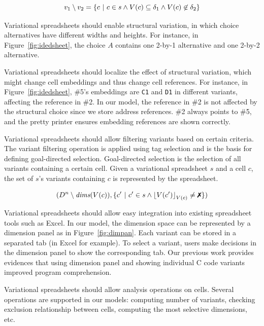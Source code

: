 \documentclass[conference]{IEEEtran}
\def\OB#1{\ifmmode#1\else\mbox{$#1$}\fi}
\newcommand{\prog}[1]{{\small\texttt{#1}}}
\newcommand{\dimset}[1][D]{\OB{#1^n}}
\newcommand{\dimsSym}{\textit{dims}}
\newcommand{\dims}[1]{\OB{\dimsSym(#1)}}
\newcommand{\dec}{\OB{\delta}}
\newcommand{\gcell}[1]{\##1}
\newcommand{\varSym}{\OB{V}}
\newcommand{\var}[1]{\varSym(#1)}
\newcommand{\unchecked}{\text{\ding{55}}}
\begin{document}
\begin{inparaenum}[(1)]
\[v_1 \setminus v_2 = \{ c \ |\ c \in s \wedge \var{c} \subseteq \dec_1 \wedge \var{c} \not\in \dec_2  \} \]

\item Variational spreadsheets should enable structural variation, in which choice alternatives
have different widths and heights. For instance, in Figure~\ref{fig:idedsheet}, the choice $A$
contains one 2-by-1 alternative and one 2-by-2 alternative.

\item Variational spreadsheets should localize the effect of structural variation, which
might change cell embeddings and thus change cell references. For instance,
in Figure~\ref{fig:idedsheet}, \gcell{5}'s embeddings are \prog{C1} and \prog{D1}
in different variants, affecting the reference in \gcell{2}. In our model, the reference
in \gcell{2} is not affected by the structural choice since we store address references.
\gcell{2} always points to \gcell{5}, and the pretty printer ensures embedding references
are shown correctly.

\item Variational spreadsheets should allow filtering variants based on certain criteria.
The variant filtering operation is applied using tag selection and is the basis for
defining goal-directed selection. Goal-directed selection is the selection of all
variants containing a certain cell. Given a variational spreadsheet $s$ and a cell $c$,
the set of $s$'s variants containing $c$ is represented by the spreadsheet.

\[
(\dimset \setminus \dims{\var{c}}, \{ c' \ |\ c' \in s \wedge \tsel[\var{c}]{\var{c'}} \neq \unchecked \})
\]

\item Variational spreadsheets should allow easy integration into existing spreadsheet tools such as Excel.
In our model, the dimension space can be represented by a dimension panel as in Figure~\ref{fig:dimpan}.
Each variant can be stored in a separated tab (in Excel for example). To select a variant, users 
make decisions in the dimension panel to show the corresponding tab. Our previous work \cite{le2011} 
provides evidences that using dimension panel and showing individual C code variants improved
program comprehension.

\item Variational spreadsheets should allow analysis operations on cells. Several operations 
are supported in our models: computing number of variants, checking exclusion relationship between
cells, computing the most selective dimensions, etc.


\end{inparaenum}
\end{document}
